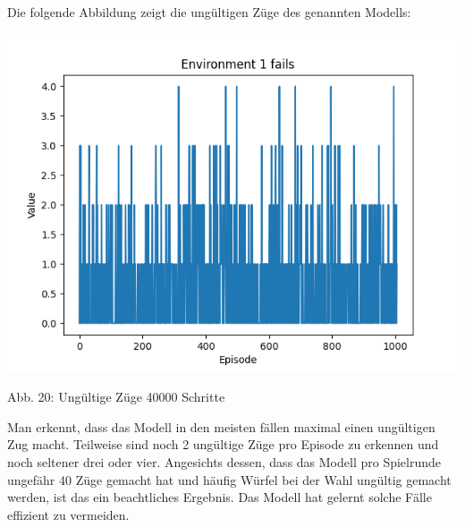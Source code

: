 \begin{minipage}{\linewidth}
	Die folgende Abbildung zeigt die ungültigen Züge des genannten Modells:
	
	\vspace{0.5cm}
	\includegraphics[width=1\textwidth]{Bilder/maskableppo_ganzschoenclever_193avg_v3.1f}
	
	Abb. 20: Ungültige Züge 40000 Schritte\\
	
\end{minipage}

Man erkennt, dass das Modell in den meisten fällen maximal einen ungültigen Zug macht. Teilweise sind noch 2 ungültige Züge pro Episode zu erkennen und noch seltener drei oder vier. Angesichts dessen, dass das Modell pro Spielrunde ungefähr 40 Züge gemacht hat und häufig Würfel bei der Wahl ungültig gemacht werden, ist das ein beachtliches Ergebnis. Das Modell hat gelernt solche Fälle effizient zu vermeiden.

